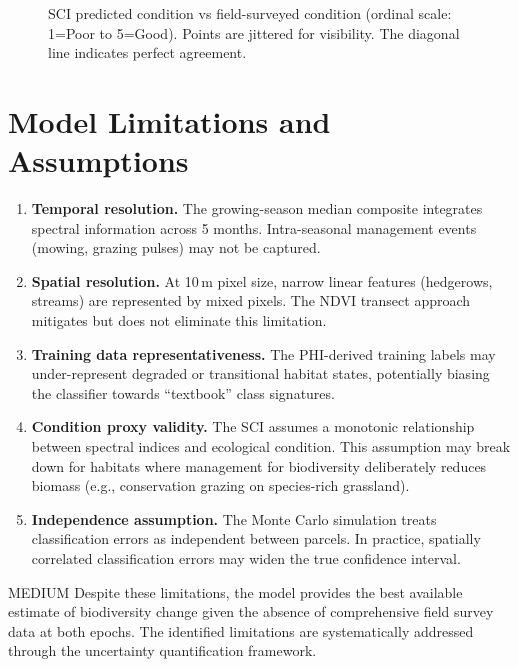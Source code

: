 \begin{figure}[H]
\centering
{}
\caption{SCI predicted condition vs field-surveyed condition (ordinal scale: 1=Poor to 5=Good). Points are jittered for visibility. The diagonal line indicates perfect agreement.}
\label{fig:sci-scatter}
\end{figure}


\section{Model Limitations and Assumptions}

\begin{enumerate}
  \item \textbf{Temporal resolution.} The growing-season median composite integrates spectral information across 5 months. Intra-seasonal management events (mowing, grazing pulses) may not be captured.

  \item \textbf{Spatial resolution.} At 10\,m pixel size, narrow linear features (hedgerows, streams) are represented by mixed pixels. The NDVI transect approach mitigates but does not eliminate this limitation.

  \item \textbf{Training data representativeness.} The PHI-derived training labels may under-represent degraded or transitional habitat states, potentially biasing the classifier towards ``textbook'' class signatures.

  \item \textbf{Condition proxy validity.} The SCI assumes a monotonic relationship between spectral indices and ecological condition. This assumption may break down for habitats where management for biodiversity deliberately reduces biomass (e.g., conservation grazing on species-rich grassland).

  \item \textbf{Independence assumption.} The Monte Carlo simulation treats classification errors as independent between parcels. In practice, spatially correlated classification errors may widen the true confidence interval.
\end{enumerate}

\begin{confidencebox}{MEDIUM}
Despite these limitations, the model provides the best available estimate of biodiversity change given the absence of comprehensive field survey data at both epochs. The identified limitations are systematically addressed through the uncertainty quantification framework.
\end{confidencebox}

